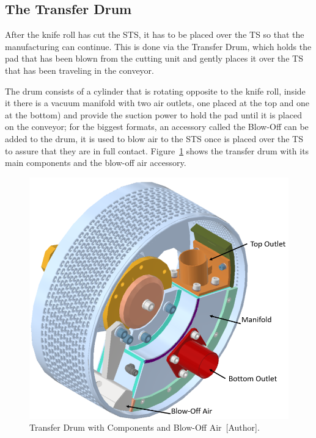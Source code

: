\subsection{The Transfer Drum}\label{sec2.1.3}

After the knife roll has cut the STS, it has to be placed over the TS so that the manufacturing can continue. This is done via the Transfer Drum, which holds the pad that has been blown from the cutting unit and gently places it over the TS that has been traveling in the conveyor.

The drum consists of a cylinder that is rotating opposite to the knife roll, inside it there is a vacuum manifold with two air outlets, one placed at the top and one at the bottom) and provide the suction power to hold the pad until it is placed on the conveyor; for the biggest formats, an accessory called the Blow-Off can be added to the drum, it is used to blow air to the STS once is placed over the TS to assure that they are in full contact. Figure~\ref{drum} shows the transfer drum with its main components and the blow-off air accessory.

\begin{figure}[H]
    \centering
    \includegraphics[width=0.5\linewidth]{FIGURES/drum.png}
    \caption{Transfer Drum with Components and Blow-Off Air~[Author].}
    \label{drum}
\end{figure}

